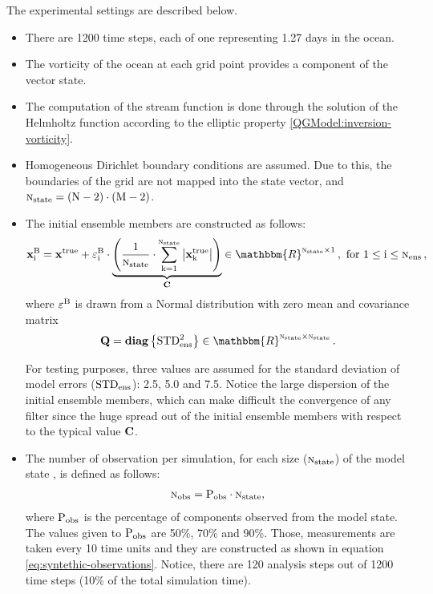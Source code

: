 \documentclass[12pt]{article}
\newcommand{\Nobs}{\textsc{n}_{{\rm obs}}}
\newcommand{\Nens}{\textsc{n}_{{\rm ens}}}
\newcommand{\Nstate}{\textsc{n}_{{\rm state}}}
\newcommand{\xb}[1]{{\bf x}^{\rm B}_{{\rm #1}}}
\newcommand{\Q}{{\bf Q}}
\newcommand{\xt}{{\bf x}^{\rm true}}
\renewcommand{\Re}{\mathbbm{R}}
\begin{document}
The experimental settings are described below.
\begin{itemize}
\item There are 1200 time steps, each of one representing 1.27 days in the ocean.
\item The vorticity of the ocean at each grid point provides a component of the vector state. 
\item The computation of the stream function is done through the solution of the Helmholtz \cite{Otto99} function according to the elliptic property \eqref{QGModel:inversion-vorticity}.
\item Homogeneous Dirichlet boundary conditions are assumed. Due to this, the boundaries of the grid are not mapped into the state vector, and $\Nstate = \rm (N-2) \cdot (M-2)$.
\item The initial ensemble members are constructed as follows:
\begin{eqnarray*}
\displaystyle \xb{i} = \xt + {\varepsilon_{\rm i}^{\rm B}} \cdot  \underbrace{\left (\frac{1}{\Nstate} \cdot \sum_{\rm k = 1}^{\Nstate} \left |  \xt_{\rm k} \right | \right )}_{\bf C} \in \Re^{\Nstate \times 1} \, , \text{ for $1 \le \rm i \le \Nens$}\, ,
\end{eqnarray*}
where ${\varepsilon^{\rm B}}$ is drawn from a Normal distribution with zero mean and covariance matrix
\begin{eqnarray} \nonumber
\displaystyle \Q = {\bf diag} \left \{ \rm STD_{ens}^2 \right \} \in \Re^{\Nstate \times \Nstate} \, .
\end{eqnarray}

For testing purposes, three values are assumed for the standard deviation of model errors ($\rm STD_{ens}$): 2.5, 5.0 and 7.5. Notice the large dispersion of the initial ensemble members, which can make difficult the convergence of any filter since the huge spread out of the initial ensemble members with respect to the typical value $\bf C$. 

\item The number of observation per simulation, for each size ($\Nstate$) of the model state , is defined as follows:
\begin{eqnarray} \nonumber
\displaystyle \Nobs = {\rm P_{obs}} \cdot \Nstate,
\end{eqnarray}
where ${\rm P_{obs}}$ is the percentage of components observed from the model state. The values given to ${\rm P_{obs}}$ are 50\%, 70\% and 90\%. Those, measurements are taken every 10 time units and they are constructed as shown in equation \eqref{eq:syntethic-observations}. Notice, there are 120 analysis steps out of 1200 time steps (10\% of the total simulation time).


\end{itemize}
\end{document}
